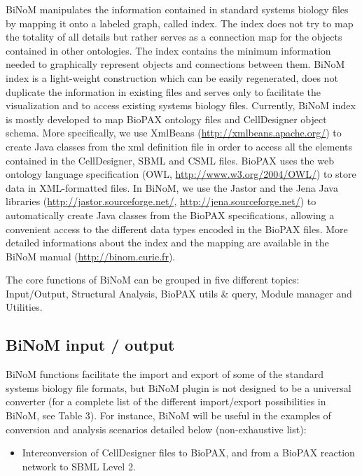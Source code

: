 \documentclass[10pt]{bmc_article}
\newenvironment{bmcformat}{\baselineskip20pt\sloppy\setboolean{publ}{false}}{\baselineskip20pt\sloppy}
\begin{document}
\begin{bmcformat}
BiNoM manipulates the information contained in standard systems biology
files by mapping it onto a labeled graph, called index. The index does not try
to map the totality of all details but rather serves as a connection map for the
objects contained in other ontologies. The index contains the minimum
information needed to graphically represent objects and connections between
them. BiNoM index is a light-weight construction which can be easily
regenerated, does not duplicate the information in existing files and serves
only to facilitate the visualization and to access existing systems biology
files. Currently, BiNoM index is mostly developed to map BioPAX ontology files
and CellDesigner object schema. More specifically, we use XmlBeans
(\url{http://xmlbeans.apache.org/}) to create Java classes from the xml definition file in
order to access all the elements contained in the CellDesigner, SBML and CSML files.
BioPAX uses the web ontology language specification (OWL,
\url{http://www.w3.org/2004/OWL/}) to store data in XML-formatted files. In
BiNoM, we use the Jastor and the Jena Java libraries
(\url{http://jastor.sourceforge.net/}, \url{http://jena.sourceforge.net/}) to
automatically create Java classes from the BioPAX specifications, allowing a
convenient access to the different data types encoded in the BioPAX files. More
detailed informations about the index and the mapping are available in the BiNoM
manual (\url{http://binom.curie.fr}).

The core functions of BiNoM can be grouped in five different topics: Input/Output,
Structural Analysis, BioPAX utils \& query, Module manager and Utilities.

\subsection*{BiNoM input / output}

BiNoM functions facilitate the import and export of some of the standard systems
biology file formats, but BiNoM plugin is not designed to be a universal
converter (for a complete list of the different import/export possibilities in
BiNoM, see Table 3).
For instance, BiNoM will be useful in the examples of conversion and analysis
scenarios detailed below (non-exhaustive list):

\begin{itemize}

\item Interconversion of CellDesigner files to BioPAX, and from a BioPAX
reaction network to SBML Level 2.


\end{itemize}
\end{bmcformat}
\end{document}
